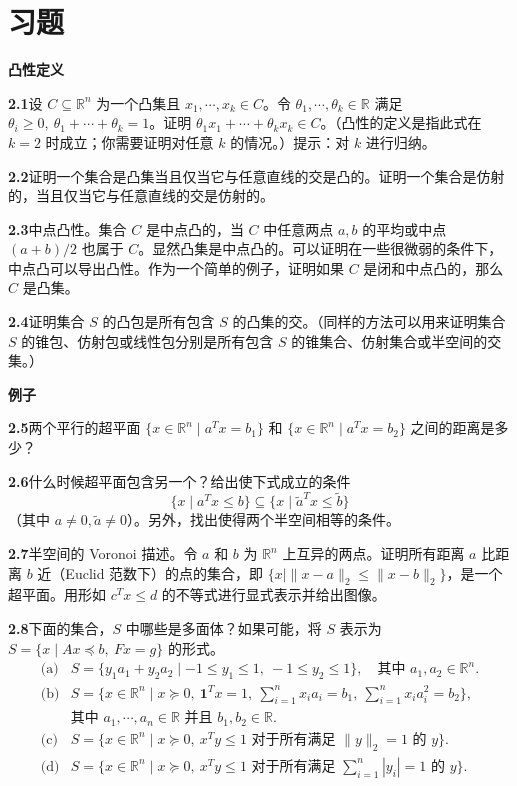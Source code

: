 \documentclass[UTF8, 12pt, fontset=fandol, oneside]{ctexart}
\begin{document}
\section*{习题}

\noindent\textbf{凸性定义}

\noindent\textbf{2.1}\quad 设 $C\subseteq\mathbb{R}^n$ 为一个凸集且 $x_1,\cdots,x_k\in C$。令 $\theta_1,\cdots,\theta_k\in\mathbb{R}$ 满足 $\theta_i\ge0,\ \theta_1+\cdots+\theta_k=1$。证明 $\theta_1x_1+\cdots+\theta_kx_k\in C$。（凸性的定义是指此式在 $k=2$ 时成立；你需要证明对任意 $k$ 的情况。）提示：对 $k$ 进行归纳。

\noindent\textbf{2.2}\quad 证明一个集合是凸集当且仅当它与任意直线的交是凸的。证明一个集合是仿射的，当且仅当它与任意直线的交是仿射的。

\noindent\textbf{2.3}\quad 中点凸性。集合 $C$ 是中点凸的，当 $C$ 中任意两点 $a,b$ 的平均或中点 $(a+b)/2$ 也属于 $C$。显然凸集是中点凸的。可以证明在一些很微弱的条件下，中点凸可以导出凸性。作为一个简单的例子，证明如果 $C$ 是闭和中点凸的，那么 $C$ 是凸集。

\noindent\textbf{2.4}\quad 证明集合 $S$ 的凸包是所有包含 $S$ 的凸集的交。（同样的方法可以用来证明集合 $S$ 的锥包、仿射包或线性包分别是所有包含 $S$ 的锥集合、仿射集合或半空间的交集。）

\noindent\textbf{例子}

\noindent\textbf{2.5}\quad 两个平行的超平面 $\{x\in\mathbb{R}^n\mid a^Tx=b_1\}$ 和 $\{x\in\mathbb{R}^n\mid a^Tx=b_2\}$ 之间的距离是多少？

\noindent\textbf{2.6}\quad 什么时候超平面包含另一个？给出使下式成立的条件
\[
  \{x\mid a^Tx\le b\}\subseteq\{x\mid \tilde{a}^Tx\le \tilde{b}\}
\]
（其中 $a\ne0,\tilde{a}\ne0$）。另外，找出使得两个半空间相等的条件。

\noindent\textbf{2.7}\quad 半空间的 Voronoi 描述。令 $a$ 和 $b$ 为 $\mathbb{R}^n$ 上互异的两点。证明所有距离 $a$ 比距离 $b$ 近（Euclid 范数下）的点的集合，即 $\{x\mid \|x-a\|_2\le\|x-b\|_2\}$，是一个超平面。用形如 $c^Tx\le d$ 的不等式进行显式表示并给出图像。

\noindent\textbf{2.8}\quad 下面的集合，$S$ 中哪些是多面体？如果可能，将 $S$ 表示为 $S=\{x\mid Ax\preceq b,\ Fx=g\}$ 的形式。
\[
  \begin{array}{ll}
  \text{(a)} & S=\{y_1a_1+y_2a_2\mid -1\le y_1\le1,\ -1\le y_2\le1\},\quad \text{其中 }a_1,a_2\in\mathbb{R}^n.\\[0.4em]
  \text{(b)} & S=\{x\in\mathbb{R}^n\mid x\succeq0,\ \mathbf{1}^Tx=1,\ \sum_{i=1}^n x_ia_i=b_1,\ \sum_{i=1}^n x_ia_i^2=b_2\},\\
  & \text{其中 }a_1,\cdots,a_n\in\mathbb{R}\text{ 并且 }b_1,b_2\in\mathbb{R}.\\[0.4em]
  \text{(c)} & S=\{x\in\mathbb{R}^n\mid x\succeq0,\ x^Ty\le1\text{ 对于所有满足 }\|y\|_2=1\text{ 的 }y\}.\\[0.4em]
  \text{(d)} & S=\{x\in\mathbb{R}^n\mid x\succeq0,\ x^Ty\le1\text{ 对于所有满足 }\sum_{i=1}^n |y_i|=1\text{ 的 }y\}.
  \end{array}
\]
\end{document}
